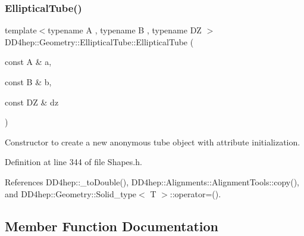 \hypertarget{class_d_d4hep_1_1_geometry_1_1_elliptical_tube_a84ca9e27e32ba80db9adbb26d1f400be}{}\label{class_d_d4hep_1_1_geometry_1_1_elliptical_tube_a84ca9e27e32ba80db9adbb26d1f400be} 
\subsubsection{\texorpdfstring{Elliptical\+Tube()}{EllipticalTube()}\hspace{0.1cm}{\footnotesize\ttfamily [6/6]}}
{\footnotesize\ttfamily template$<$typename A , typename B , typename DZ $>$ \\
D\+D4hep\+::\+Geometry\+::\+Elliptical\+Tube\+::\+Elliptical\+Tube (\begin{DoxyParamCaption}\item[{const A \&}]{a,  }\item[{const B \&}]{b,  }\item[{const DZ \&}]{dz }\end{DoxyParamCaption})\hspace{0.3cm}{\ttfamily [inline]}}



Constructor to create a new anonymous tube object with attribute initialization. 



Definition at line 344 of file Shapes.\+h.



References D\+D4hep\+::\+\_\+to\+Double(), D\+D4hep\+::\+Alignments\+::\+Alignment\+Tools\+::copy(), and D\+D4hep\+::\+Geometry\+::\+Solid\+\_\+type$<$ T $>$\+::operator=().



\subsection{Member Function Documentation}
\hypertarget{class_d_d4hep_1_1_geometry_1_1_elliptical_tube_a33fcff3b6382c727153417bb115bacb9}{}\label{class_d_d4hep_1_1_geometry_1_1_elliptical_tube_a33fcff3b6382c727153417bb115bacb9} 
